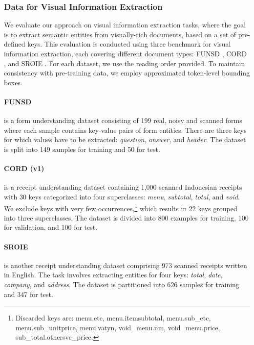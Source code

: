 \subsubsection{Data for Visual Information Extraction}

We evaluate our approach on visual information extraction tasks, where the goal is to extract semantic entities from visually-rich documents, based on a set of pre-defined keys. This evaluation is conducted using three benchmark for visual information extraction, each covering different document types: FUNSD \citep{jaume2019funsd}, CORD \citep{park2019cord}, and SROIE \citep{huang2019icdar2019}. For each dataset, we use the reading order provided. To maintain consistency with pre-training data, we employ approximated token-level bounding boxes.

\paragraph{FUNSD} \citep{jaume2019funsd} is a form understanding dataset consisting of 199 real, noisy and scanned forms where each sample contains key-value pairs of form entities. There are three keys for which values have to be extracted: \textit{question}, \textit{answer}, and \textit{header}. The dataset is split into 149 samples for training and 50 for test.

\paragraph{CORD (v1)} \citep{park2019cord} is a receipt understanding dataset containing 1,000 scanned Indonesian receipts with 30 keys categorized into four superclasses: \textit{menu}, \textit{subtotal}, \textit{total}, and \textit{void}. We exclude keys with very few occurrences,\footnote{Discarded keys are: menu.etc, menu.itemsubtotal, menu.sub\_etc, menu.sub\_unitprice, menu.vatyn, void\_menu.nm, void\_menu.price, sub\_total.othersvc\_price.} which results in 22 keys grouped into three superclasses. The dataset is divided into 800 examples for training, 100 for validation, and 100 for test.

\paragraph{SROIE} \citep{huang2019icdar2019} is another receipt understanding dataset comprising 973 scanned receipts written in English. The task involves extracting entities for four keys: \textit{total}, \textit{date}, \textit{company}, and \textit{address}. The dataset is partitioned into 626 samples for training and 347 for test. 

